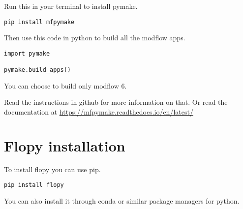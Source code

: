 \documentclass[titlepage,12pt]{unisubmission}
\begin{document}
Run this in your terminal to install pymake.
\begin{verbatim}
pip install mfpymake  
\end{verbatim}

Then use this code in python to build all the modflow apps.
\begin{verbatim}
import pymake

pymake.build_apps()
\end{verbatim}

You can choose to build only modflow 6.

Read the instructions in github for more information on that. Or read the documentation at \url{https://mfpymake.readthedocs.io/en/latest/}

\section{Flopy installation}
\label{sec:orgb19794f}
To install flopy you can use pip.
\begin{verbatim}
pip install flopy
\end{verbatim}

You can also install it through conda or similar package managers for python.
\end{document}
